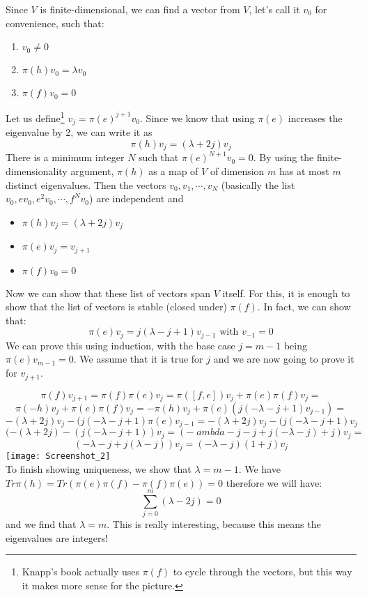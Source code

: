 \documentclass{article}
\begin{document}
Since $V$ is finite-dimensional, we can find a vector from $V$, let's call it $v_{0}$ for convenience, such that:
\begin{enumerate}
\item $v_{0}\neq 0$
\item $\pi(h)v_{0}=\lambda v_0$
\item $\pi(f)v_{0} = 0$
\end{enumerate}

Let us define\footnote{Knapp's book actually uses $\pi(f)$ to cycle through the vectors, but this way it makes more sense for the picture.} $v_{j} = \pi(e)^{j+1} v_{0}$. Since we know that using $\pi(e)$ increases the eigenvalue by 2, we can write it as $$\pi(h)v_j = (\lambda+2j)v_j $$
There is a minimum integer $N$ such that $\pi(e)^{N+1}v_{0} = 0$. By using the finite-dimensionality argument, $\pi(h)$ as a map of $V$ of dimension $m$ has at most $m$ distinct eigenvalues. Then the vectors $v_0,v_{1},\cdots, v_{N}$ (basically the list $v_0,ev_{0},e^2v_{0},\cdots,f^{N}v_{0}$) are independent and
\begin{itemize}
\item $\pi(h)v_j = (\lambda +2j)v_j$
\item $\pi(e)v_{j} =v_{j+1} $
\item $\pi(f)v_0 = 0$ 
\end{itemize}

Now we can show that these list of vectors span $V$ itself. For this, it is enough to show that the list of vectors
is stable (closed under)  $\pi(f)$. In fact, we can show that:
$$\pi(e)v_j = j(\lambda-j+1)v_{j-1} \text{ with } v_{-1} = 0  $$
We can prove this using induction, with the base case $j=m-1$ being $\pi(e)v_{m-1} =0 $. We assume that it is true for $j$ and we are now going to prove it for $v_{j+1}$.

$$\pi(f)v_{j+1}=\pi(f)\pi(e)v_j=\pi([f,e])v_j+\pi(e)\pi(f)v_j=$$
$$\pi(-h)v_j+\pi(e)\pi(f)v_j=-\pi(h)v_j+\pi(e)(j(-\lambda -j+1)v_{j-1})=$$
$$-(\lambda+2j)v_j - (j(-\lambda -j+1)\pi(e)v_{j-1} =-(\lambda+2j)v_j - (j(-\lambda -j+1)v_j$$
$$(-(\lambda+2j)- (j(-\lambda -j+1))v_j = (-\;ambda-j-j+j(-\lambda-j)+j)v_j= $$
$$(-\lambda-j+j(\lambda -j))v_j= (-\lambda-j)(1+j)v_j $$
\texttt{[image: Screenshot\_2]}\\
To finish showing uniqueness, we show that $\lambda = m-1$. We have $Tr\pi(h) = Tr(\pi(e)\pi(f)-\pi(f)\pi(e))=0$ therefore we will have:
$$\sum_{j=0}^m(\lambda-2j)=0 $$
and we find that $\lambda = m$. This is really interesting, because this means the eigenvalues are integers!
\end{document}
